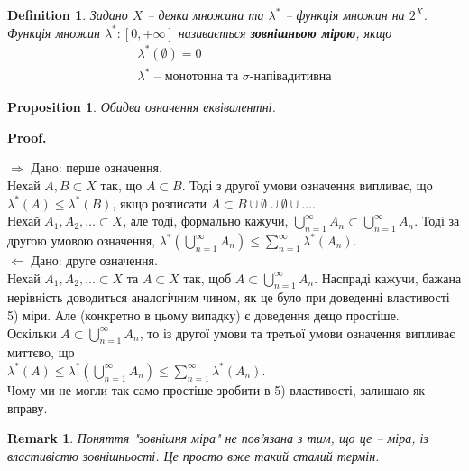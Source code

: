\documentclass[a4paper, 10pt]{article}
\makeatletter
\def\rightproof{$\boxed{\Rightarrow}$ }
\def\leftproof{$\boxed{\Leftarrow}$ }
\theoremstyle{theoremdd}
\newtheorem{definition}[theorem]{Definition}
\newtheorem{proposition}[theorem]{Proposition}
\newtheorem{remark}[theorem]{Remark}
\renewenvironment{proof}[1][Proof.\\]{\par
\pushQED{\hfill \qed}%
\normalfont \topsep6\p@\@plus6\p@\relax
\trivlist
\item\relax
{\bfseries
#1\@addpunct{.}}\hspace\labelsep\ignorespaces
}{%
\popQED\endtrivlist\@endpefalse
}
\makeatother
\begin{document}
\begin{definition}
Задано $X$ -- деяка множина та $\lambda^*$ -- функція множин на $2^X$.\\
Функція множин $\lambda^* \colon [0,+\infty]$ називається \textbf{зовнішньою мірою}, якщо
\begin{align*}
\lambda^*(\emptyset) = 0 \\
\lambda^* \text{ -- монотонна та $\sigma$-напівадитивна}
\end{align*}
\end{definition}

\begin{proposition}
Обидва означення еквівалентні.
\end{proposition}

\begin{proof}
\rightproof Дано: перше означення. \\
Нехай $A,B \subset X$ так, що $A \subset B$. Тоді з другої умови означення випливає, що $\lambda^*(A) \leq \lambda^*(B)$, якщо розписати $A \subset B \cup \emptyset \cup \emptyset \cup \dots$.\\
Нехай $A_1,A_2,\dots \subset X$, але тоді, формально кажучи, $\displaystyle\bigcup_{n=1}^\infty A_n \subset \displaystyle\bigcup_{n=1}^\infty A_n$. Тоді за другою умовою означення, $\displaystyle\lambda^*\left(\bigcup_{n=1}^\infty A_n\right) \leq \sum_{n=1}^\infty \lambda^*(A_n)$.
\bigskip \\
\leftproof Дано: друге означення.\\
Нехай $A_1,A_2,\dots \subset X$ та $A \subset X$ так, щоб $A \subset \displaystyle\bigcup_{n=1}^\infty A_n$. Наспраді кажучи, бажана нерівність доводиться аналогічним чином, як це було при доведенні властивості 5) міри. Але (конкретно в цьому випадку) є доведення дещо простіше.\\
Оскільки $A \subset \displaystyle\bigcup_{n=1}^\infty A_n$, то із другої умови та третьої умови означення випливає миттєво, що \\ $\displaystyle\lambda^*(A) \leq \lambda^*\left( \bigcup_{n=1}^\infty A_n \right) \leq \sum_{n=1}^\infty \lambda^*(A_n)$.\\
Чому ми не могли так само простіше зробити в 5) властивості, залишаю як вправу.
\end{proof}

\begin{remark}
Поняття "зовнішня міра" не пов'язана з тим, що це -- міра, із властивістю зовнішньості. Це просто вже такий сталий термін.
\end{remark}
\end{document}
